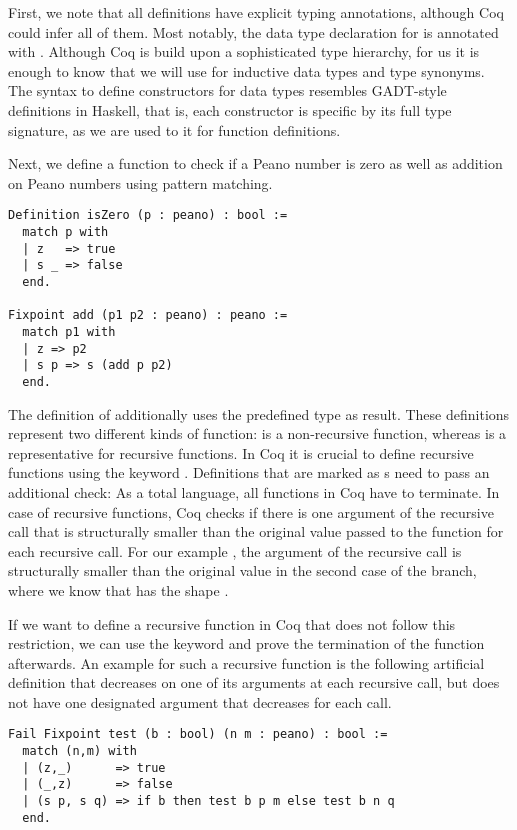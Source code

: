 First, we note that all definitions have explicit typing annotations, although Coq could infer all of them.
Most notably, the data type declaration for  is annotated with .
Although Coq is build upon a sophisticated type hierarchy, for us it is enough to know that we will use  for inductive data types and type synonyms.
The syntax to define constructors for data types resembles GADT-style definitions in Haskell, that is, each constructor is specific by its full type signature, as we are used to it for function definitions.

Next, we define a function to check if a Peano number is zero as well as addition on Peano numbers using pattern matching.

\begin{verbatim}
Definition isZero (p : peano) : bool :=
  match p with
  | z   => true
  | s _ => false
  end.

Fixpoint add (p1 p2 : peano) : peano :=
  match p1 with
  | z => p2
  | s p => s (add p p2)
  end.
\end{verbatim}

The definition of  additionally uses the predefined  type as result.
These definitions represent two different kinds of function:  is a non-recursive function, whereas  is a representative for recursive functions.
In Coq it is crucial to define recursive functions using the keyword .
Definitions that are marked as s need to pass an additional check: As a total language, all functions in Coq have to terminate.
In case of recursive functions, Coq checks if there is one argument of the recursive call that is structurally smaller than the original value passed to the function for each recursive call.
For our example , the argument  of the recursive call is structurally smaller than the original value  in the second case of the branch, where we know that  has the shape .

If we want to define a recursive function in Coq that does not follow this restriction, we can use the keyword  and prove the termination of the function afterwards.
An example for such a recursive function is the following artificial definition that decreases on one of its arguments at each recursive call, but does not have one designated argument that decreases for each call.

\begin{verbatim}
Fail Fixpoint test (b : bool) (n m : peano) : bool :=
  match (n,m) with
  | (z,_)      => true
  | (_,z)      => false
  | (s p, s q) => if b then test b p m else test b n q
  end.
\end{verbatim}

